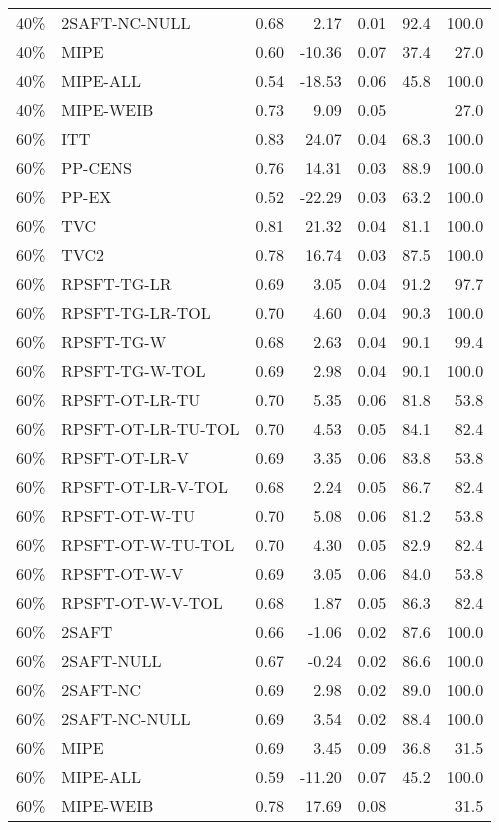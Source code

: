 \begin{table}[ht]
{\begin{tabular}{llrrrrr}
  40\% & 2SAFT-NC-NULL & 0.68 & 2.17 & 0.01 & 92.4 & 100.0 \\ 
  40\% & MIPE & 0.60 & -10.36 & 0.07 & 37.4 & 27.0 \\ 
  40\% & MIPE-ALL & 0.54 & -18.53 & 0.06 & 45.8 & 100.0 \\ 
  40\% & MIPE-WEIB & 0.73 & 9.09 & 0.05 &  & 27.0 \\ 
   \hline
60\% & ITT & 0.83 & 24.07 & 0.04 & 68.3 & 100.0 \\ 
  60\% & PP-CENS & 0.76 & 14.31 & 0.03 & 88.9 & 100.0 \\ 
  60\% & PP-EX & 0.52 & -22.29 & 0.03 & 63.2 & 100.0 \\ 
  60\% & TVC & 0.81 & 21.32 & 0.04 & 81.1 & 100.0 \\ 
  60\% & TVC2 & 0.78 & 16.74 & 0.03 & 87.5 & 100.0 \\ 
   \hline
60\% & RPSFT-TG-LR & 0.69 & 3.05 & 0.04 & 91.2 & 97.7 \\ 
  60\% & RPSFT-TG-LR-TOL & 0.70 & 4.60 & 0.04 & 90.3 & 100.0 \\ 
  60\% & RPSFT-TG-W & 0.68 & 2.63 & 0.04 & 90.1 & 99.4 \\ 
  60\% & RPSFT-TG-W-TOL & 0.69 & 2.98 & 0.04 & 90.1 & 100.0 \\ 
  60\% & RPSFT-OT-LR-TU & 0.70 & 5.35 & 0.06 & 81.8 & 53.8 \\ 
  60\% & RPSFT-OT-LR-TU-TOL & 0.70 & 4.53 & 0.05 & 84.1 & 82.4 \\ 
  60\% & RPSFT-OT-LR-V & 0.69 & 3.35 & 0.06 & 83.8 & 53.8 \\ 
  60\% & RPSFT-OT-LR-V-TOL & 0.68 & 2.24 & 0.05 & 86.7 & 82.4 \\ 
   \hline
60\% & RPSFT-OT-W-TU & 0.70 & 5.08 & 0.06 & 81.2 & 53.8 \\ 
  60\% & RPSFT-OT-W-TU-TOL & 0.70 & 4.30 & 0.05 & 82.9 & 82.4 \\ 
  60\% & RPSFT-OT-W-V & 0.69 & 3.05 & 0.06 & 84.0 & 53.8 \\ 
  60\% & RPSFT-OT-W-V-TOL & 0.68 & 1.87 & 0.05 & 86.3 & 82.4 \\ 
   \hline
60\% & 2SAFT & 0.66 & -1.06 & 0.02 & 87.6 & 100.0 \\ 
  60\% & 2SAFT-NULL & 0.67 & -0.24 & 0.02 & 86.6 & 100.0 \\ 
  60\% & 2SAFT-NC & 0.69 & 2.98 & 0.02 & 89.0 & 100.0 \\ 
  60\% & 2SAFT-NC-NULL & 0.69 & 3.54 & 0.02 & 88.4 & 100.0 \\ 
  60\% & MIPE & 0.69 & 3.45 & 0.09 & 36.8 & 31.5 \\ 
  60\% & MIPE-ALL & 0.59 & -11.20 & 0.07 & 45.2 & 100.0 \\ 
  60\% & MIPE-WEIB & 0.78 & 17.69 & 0.08 &  & 31.5 \\ 
   \hline
\end{tabular}
}
\end{table}
